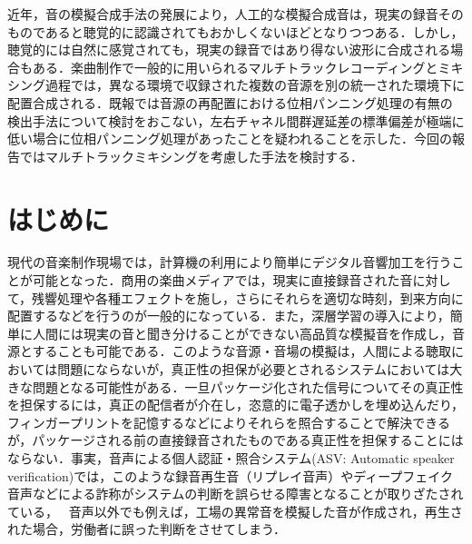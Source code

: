 \documentclass[technicalreport]{ieicej}
\begin{document}
\begin{jabstract}
近年，音の模擬合成手法の発展により，人工的な模擬合成音は，現実の録音そのものであると聴覚的に認識されてもおかしくないほどとなりつつある．しかし，聴覚的には自然に感覚されても，現実の録音ではあり得ない波形に合成される場合もある．楽曲制作で一般的に用いられるマルチトラックレコーディングとミキシング過程では，異なる環境で収録された複数の音源を別の統一された環境下に配置合成される．既報では音源の再配置における位相パンニング処理の有無の検出手法について検討をおこない，左右チャネル間群遅延差の標準偏差が極端に低い場合に位相パンニング処理があったことを疑われることを示した．今回の報告ではマルチトラックミキシングを考慮した手法を検討する．
\end{jabstract}
\begin{jkeyword}
\end{jkeyword}
\begin{eabstract}
\end{eabstract}
\begin{ekeyword}
\end{ekeyword}
\maketitle

\section{はじめに}
現代の音楽制作現場では，計算機の利用により簡単にデジタル音響加工を行うことが可能となった．商用の楽曲メディアでは，現実に直接録音された音に対して，残響処理や各種エフェクトを施し，さらにそれらを適切な時刻，到来方向に配置するなどを行うのが一般的になっている．また，深層学習の導入により，簡単に人間には現実の音と聞き分けることができない高品質な模擬音を作成し，音源とすることも可能である．このような音源・音場の模擬は，人間による聴取においては問題にならないが，真正性の担保が必要とされるシステムにおいては大きな問題となる可能性がある．一旦パッケージ化された信号についてその真正性を担保するには，真正の配信者が介在し，恣意的に電子透かしを埋め込んだり，フィンガープリントを記憶するなどによりそれらを照合することで解決できるが，パッケージされる前の直接録音されたものである真正性を担保することにはならない．事実，音声による個人認証・照合システム(ASV: Automatic speaker verification)では，このような録音再生音（リプレイ音声）やディープフェイク音声などによる詐称がシステムの判断を誤らせる障害となることが取りざたされている，　
音声以外でも例えば，工場の異常音を模擬した音が作成され，再生された場合，労働者に誤った判断をさせてしまう．
\end{document}
